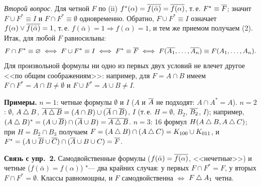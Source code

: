 \begin{solution}[3 (\S\,3)]
\emph{Второй вопрос.} Для четной $F$ по (ii) $f^*(\alpha)=\overline{f(\bar\alpha)}=\overline{f(\alpha)}$,
т.\,е. $F^*\equiv\overline{F}$; значит $F\cup F^*\equiv I$ и $F\cap F^*\equiv\emptyset$
одновременно. Обратно, $F\cup F^*\equiv I$ означает
$f(\alpha)\vee\overline{f(\bar\alpha)}=1$, т.\,е. $f(\bar\alpha)=1\Rightarrow f(\alpha)=1$,
и тем же приемом получаем (2). Итак, для любой $F$ равносильны:
\[
F\cap F^*\equiv\varnothing\iff F\cup F^*\equiv I\iff F^*\equiv\overline{F}\iff
F(\overline{A_1},\dots,\overline{A_n})\equiv F(A_1,\dots,A_n).
\]
Для произвольной формулы ни одно из первых двух условий не влечет
другое <<по общим соображениям>>: например, для $F=A\cap B$ имеем
$F\cap F^*=A\cap B\ne\emptyset$ и $F\cup F^*=A\cup B\ne I$.

\textbf{Примеры.} $n=1$: четные формулы $\emptyset$ и $I$ ($A$ и $\overline{A}$
не подходят: $A\cap A^*=A$). $n=2$: $\emptyset$, $A\mathbin{\triangle} B$,
$\overline{A\mathbin{\triangle} B}=(A\cap B)\cup(\overline{A}\cap\overline{B})$, $I$ (т.\,е. $H=\emptyset$,
$B_2$, $\overline{B_2}$, $I$); например,
$(A\mathbin{\triangle} B)^*=(A\cup\overline{B})\cap(\overline{A}\cup B)=\overline{A\mathbin{\triangle} B}$. $n=3$: 16 формул
$H(A\mathbin{\triangle} B,A\mathbin{\triangle} C)$; при $H=B_2\cap B_3$ получаем
$F=(A\mathbin{\triangle} B)\cap(A\mathbin{\triangle} C)=K_{100}\cup K_{011}$, и
$F^*=(A\cup\overline{B}\cup\overline{C})\cap(\overline{A}\cup B\cup C)=\overline{F}$.

\textbf{Связь с упр.~2.} Самодвойственные формулы ($f(\bar\alpha)=\overline{f(\alpha)}$,
<<нечетные>>) и четные ($f(\bar\alpha)=f(\alpha)$) "--- два крайних
случая: у первых $F\cap F^*=F$, у вторых $F\cap F^*=\emptyset$. Классы
равномощны, и $F$ самодвойственна $\iff$ $F\mathbin{\triangle} A_1$ четна.
\end{solution}

